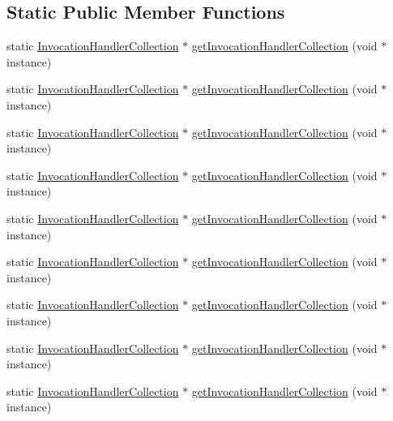 \subsection*{Static Public Member Functions}
\begin{DoxyCompactItemize}
\item 
static \mbox{\hyperlink{structfakeit_1_1InvocationHandlerCollection}{Invocation\+Handler\+Collection}} $\ast$ \mbox{\hyperlink{structfakeit_1_1InvocationHandlerCollection_aad3a5dbdcd7a4b849b9ba2f8be4f4d09}{get\+Invocation\+Handler\+Collection}} (void $\ast$instance)
\item 
static \mbox{\hyperlink{structfakeit_1_1InvocationHandlerCollection}{Invocation\+Handler\+Collection}} $\ast$ \mbox{\hyperlink{structfakeit_1_1InvocationHandlerCollection_aad3a5dbdcd7a4b849b9ba2f8be4f4d09}{get\+Invocation\+Handler\+Collection}} (void $\ast$instance)
\item 
static \mbox{\hyperlink{structfakeit_1_1InvocationHandlerCollection}{Invocation\+Handler\+Collection}} $\ast$ \mbox{\hyperlink{structfakeit_1_1InvocationHandlerCollection_aad3a5dbdcd7a4b849b9ba2f8be4f4d09}{get\+Invocation\+Handler\+Collection}} (void $\ast$instance)
\item 
static \mbox{\hyperlink{structfakeit_1_1InvocationHandlerCollection}{Invocation\+Handler\+Collection}} $\ast$ \mbox{\hyperlink{structfakeit_1_1InvocationHandlerCollection_aad3a5dbdcd7a4b849b9ba2f8be4f4d09}{get\+Invocation\+Handler\+Collection}} (void $\ast$instance)
\item 
static \mbox{\hyperlink{structfakeit_1_1InvocationHandlerCollection}{Invocation\+Handler\+Collection}} $\ast$ \mbox{\hyperlink{structfakeit_1_1InvocationHandlerCollection_aad3a5dbdcd7a4b849b9ba2f8be4f4d09}{get\+Invocation\+Handler\+Collection}} (void $\ast$instance)
\item 
static \mbox{\hyperlink{structfakeit_1_1InvocationHandlerCollection}{Invocation\+Handler\+Collection}} $\ast$ \mbox{\hyperlink{structfakeit_1_1InvocationHandlerCollection_aad3a5dbdcd7a4b849b9ba2f8be4f4d09}{get\+Invocation\+Handler\+Collection}} (void $\ast$instance)
\item 
static \mbox{\hyperlink{structfakeit_1_1InvocationHandlerCollection}{Invocation\+Handler\+Collection}} $\ast$ \mbox{\hyperlink{structfakeit_1_1InvocationHandlerCollection_aad3a5dbdcd7a4b849b9ba2f8be4f4d09}{get\+Invocation\+Handler\+Collection}} (void $\ast$instance)
\item 
static \mbox{\hyperlink{structfakeit_1_1InvocationHandlerCollection}{Invocation\+Handler\+Collection}} $\ast$ \mbox{\hyperlink{structfakeit_1_1InvocationHandlerCollection_aad3a5dbdcd7a4b849b9ba2f8be4f4d09}{get\+Invocation\+Handler\+Collection}} (void $\ast$instance)
\item 
static \mbox{\hyperlink{structfakeit_1_1InvocationHandlerCollection}{Invocation\+Handler\+Collection}} $\ast$ \mbox{\hyperlink{structfakeit_1_1InvocationHandlerCollection_aad3a5dbdcd7a4b849b9ba2f8be4f4d09}{get\+Invocation\+Handler\+Collection}} (void $\ast$instance)
\end{DoxyCompactItemize}
